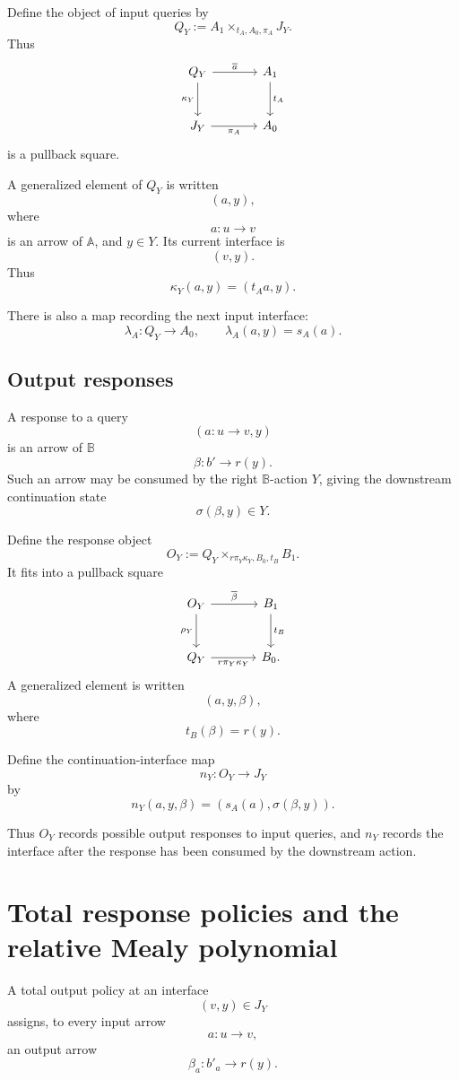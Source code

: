 Define the object of input queries by
\[
Q_Y:=A_1\times_{t_A,A_0,\pi_A}J_Y.
\]
Thus
\[
\begin{tikzcd}[column sep=large,row sep=large]
Q_Y
  \arrow[r, "\overline a"]
  \arrow[d, "\kappa_Y"']
&
A_1
  \arrow[d, "t_A"]
\\
J_Y
  \arrow[r, "\pi_A"']
&
A_0
\end{tikzcd}
\]
is a pullback square.

A generalized element of \(Q_Y\) is written
\[
(a,y),
\]
where
\[
a:u\to v
\]
is an arrow of \(\mathbb A\), and \(y\in Y\).  Its current interface is
\[
(v,y).
\]
Thus
\[
\kappa_Y(a,y)=(t_Aa,y).
\]

There is also a map recording the next input interface:
\[
\lambda_A:Q_Y\to A_0,
\qquad
\lambda_A(a,y)=s_A(a).
\]

\subsection{Output responses}

A response to a query
\[
(a:u\to v,y)
\]
is an arrow of \(\mathbb B\)
\[
\beta:b'\to r(y).
\]
Such an arrow may be consumed by the right \(\mathbb B\)-action \(Y\), giving
the downstream continuation state
\[
\sigma(\beta,y)\in Y.
\]

Define the response object
\[
O_Y
:=
Q_Y\times_{r\pi_Y\kappa_Y,B_0,t_B}B_1.
\]
It fits into a pullback square
\[
\begin{tikzcd}[column sep=large,row sep=large]
O_Y
  \arrow[r, "\overline\beta"]
  \arrow[d, "\rho_Y"']
&
B_1
  \arrow[d, "t_B"]
\\
Q_Y
  \arrow[r, "r\pi_Y\kappa_Y"']
&
B_0 .
\end{tikzcd}
\]
A generalized element is written
\[
(a,y,\beta),
\]
where
\[
t_B(\beta)=r(y).
\]

Define the continuation-interface map
\[
n_Y:O_Y\to J_Y
\]
by
\[
n_Y(a,y,\beta)
=
\left(
s_A(a),
\sigma(\beta,y)
\right).
\]

Thus \(O_Y\) records possible output responses to input queries, and
\(n_Y\) records the interface after the response has been consumed by the
downstream action.

\section{Total response policies and the relative Mealy polynomial}
\label{sec:poly-relative-total-response-policies}

A total output policy at an interface
\[
(v,y)\in J_Y
\]
assigns, to every input arrow
\[
a:u\to v,
\]
an output arrow
\[
\beta_a:b'_a\to r(y).
\]

